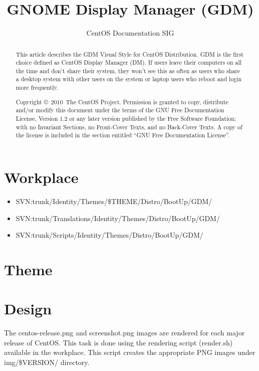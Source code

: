 \documentclass{article}
\title{GNOME Display Manager (GDM)}
\author{CentOS Documentation SIG}
\begin{document}
\maketitle

\begin{abstract} 
This article describes the GDM Visual Style for CentOS Distribution.
GDM is the first choice defined as CentOS Display Manager (DM). If
users leave their computers on all the time and don't share their
system, they won't see this as often as users who share a desktop
system with other users on the system or laptop users who reboot and
login more frequently.

Copyright \copyright\ 2010\ The CentOS Project. Permission is
granted to copy, distribute and/or modify this document under the
terms of the GNU Free Documentation License, Version 1.2 or any later
version published by the Free Software Foundation; with no Invariant
Sections, no Front-Cover Texts, and no Back-Cover Texts. A copy of the
license is included in the section entitled ``GNU Free Documentation
License''.  
\end{abstract}

\tableofcontents

\section{Workplace}

\begin{itemize}
\item SVN:trunk/Identity/Themes/\$THEME/Distro/BootUp/GDM/
\item SVN:trunk/Translations/Identity/Themes/Distro/BootUp/GDM/
\item SVN:trunk/Scripts/Identity/Themes/Distro/BootUp/GDM/
\end{itemize}

\section{Theme}



\section{Design}

The centos-release.png and screenshot.png images are rendered for each
major release of CentOS. This task is done using the rendering script
(render.sh) available in the workplace.  This script creates the
appropriate PNG images under img/\$VERSION/ directory. 
\end{document}

